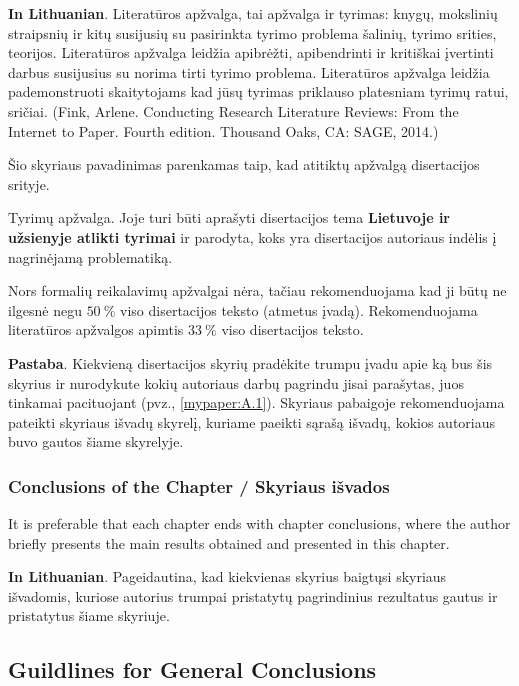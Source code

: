 \textbf{In Lithuanian}. Literatūros apžvalga, tai apžvalga ir tyrimas: knygų, mokslinių straipsnių ir kitų susijusių su pasirinkta tyrimo problema šalinių, tyrimo srities, teorijos. 
Literatūros apžvalga leidžia apibrėžti, apibendrinti ir kritiškai įvertinti darbus susijusius su norima tirti tyrimo problema.
Literatūros apžvalga leidžia pademonstruoti skaitytojams kad jūsų tyrimas priklauso platesniam tyrimų ratui, sričiai. (Fink, Arlene. Conducting Research Literature Reviews: From the Internet to Paper. Fourth edition. Thousand Oaks, CA: SAGE, 2014.) 


Šio skyriaus pavadinimas parenkamas taip, kad atitiktų apžvalgą disertacijos srityje.

Tyrimų apžvalga. Joje turi būti aprašyti disertacijos tema \textbf{Lietuvoje ir užsienyje atlikti tyrimai} ir parodyta, koks yra disertacijos autoriaus indėlis į nagrinėjamą problematiką.

Nors formalių reikalavimų apžvalgai nėra, tačiau rekomenduojama kad ji būtų ne ilgesnė negu $50\ \%$ viso disertacijos teksto (atmetus įvadą). Rekomenduojama literatūros apžvalgos apimtis $33\ \%$ viso disertacijos teksto.

\textbf{Pastaba}. Kiekvieną disertacijos skyrių pradėkite trumpu įvadu apie ką bus šis skyrius ir nurodykute kokių autoriaus darbų pagrindu jisai parašytas, juos tinkamai pacituojant (pvz., \ref{mypaper:A.1}). Skyriaus pabaigoje rekomenduojama pateikti skyriaus išvadų skyrelį, kuriame paeikti sąrašą išvadų, kokios autoriaus buvo gautos šiame skyrelyje.


\subsubsection{Conclusions of the Chapter / Skyriaus išvados}
It is preferable that each chapter ends with chapter conclusions, where the author briefly presents the main results obtained and presented in this chapter.

\textbf{In Lithuanian}. Pageidautina, kad kiekvienas skyrius baigtųsi skyriaus išvadomis, kuriose autorius trumpai pristatytų pagrindinius rezultatus gautus ir pristatytus šiame skyriuje.

\subsection{Guildlines for General Conclusions}

